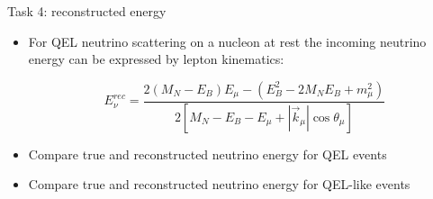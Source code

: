 \begin{slide}[toc=Task 4]{Task 4: reconstructed energy}
\null\vfill

  \begin{itemize}
   
    \item For QEL neutrino scattering on a nucleon at rest the incoming neutrino energy can be expressed by lepton kinematics:

    $$E_\nu^{rec} = \frac{2(M_N - E_B)E_\mu - (E_B^2 - 2M_NE_B + m_\mu^2)}{2[M_N - E_B - E_\mu + |\vec k_\mu|\cos\theta_\mu]}$$
    
    \item Compare true and reconstructed neutrino energy for QEL events
    
    \item Compare true and reconstructed neutrino energy for QEL-like events

  \end{itemize}

\vfill\null
\end{slide}